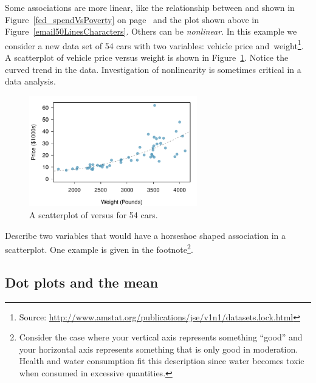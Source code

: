 \begin{example}{Some associations are more linear, like the relationship between  and  shown in Figure~\ref{fed_spendVsPoverty} on page~\pageref{fed_spendVsPoverty} and the plot shown above in Figure~\ref{email50LinesCharacters}. Others can be \emph{nonlinear}. In this example we consider a new data set of 54 cars with two variables: vehicle price and~weight\footnote{Source: \url{http://www.amstat.org/publications/jse/v1n1/datasets.lock.html}}.}
A scatterplot of vehicle price versus weight is shown in Figure~\ref{carsPriceVsWeight}. Notice the curved trend in the data. Investigation of nonlinearity is sometimes critical in a data analysis.
\begin{figure}[h]
   \centering
   \includegraphics[width=0.65\textwidth]{01/figures/carsPriceVsWeight/carsPriceVsWeight}
   \caption{A scatterplot of  versus  for 54 cars.}
   \label{carsPriceVsWeight}
\end{figure}
\end{example}

\begin{exercise}
Describe two variables that would have a horseshoe shaped association in a scatterplot. One example is given in the footnote\footnote{Consider the case where your vertical axis represents something ``good'' and your horizontal axis represents something that is only good in moderation. Health and water consumption fit this description since water becomes toxic when consumed in excessive quantities.}.
\end{exercise}

\subsection{Dot plots and the mean}
\label{dotPlot}

